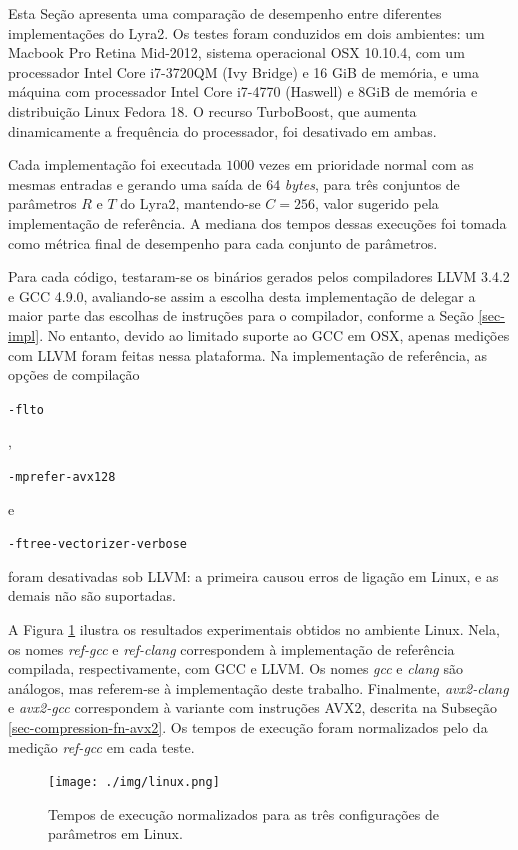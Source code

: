 \documentclass{article}
\begin{document}
Esta Seção apresenta uma comparação de desempenho entre diferentes
implementações do Lyra2. Os testes foram conduzidos em dois ambientes: um
Macbook Pro Retina Mid-2012, sistema operacional OSX 10.10.4, com um
processador Intel Core i7-3720QM (Ivy Bridge) e 16 GiB de memória, e uma
máquina com processador Intel Core i7-4770 (Haswell) e 8GiB de memória e
distribuição Linux Fedora 18. O recurso TurboBoost, que aumenta dinamicamente a
frequência do processador, foi desativado em ambas.

Cada implementação foi executada $1000$ vezes em prioridade normal com as
mesmas entradas e gerando uma saída de $64$ \emph{bytes}, para três conjuntos de parâmetros $R$ e
$T$ do Lyra2, mantendo-se $C = 256$, valor sugerido pela implementação de
referência. A mediana dos tempos dessas execuções foi tomada como métrica final
de desempenho para cada conjunto de parâmetros.

Para cada código, testaram-se os binários gerados pelos compiladores LLVM 3.4.2
e GCC 4.9.0, avaliando-se assim a escolha desta implementação de delegar a maior parte
das escolhas de instruções para o compilador, conforme a Seção \ref{sec-impl}.
No entanto, devido ao limitado suporte ao GCC em OSX, apenas medições com LLVM
foram feitas nessa plataforma. Na implementação de referência, as opções de
compilação \begin{small}\verb|-flto|\end{small},
\begin{small}\verb|-mprefer-avx128|\end{small} e
\begin{small}\verb|-ftree-vectorizer-verbose|\end{small} foram desativadas sob
LLVM: a primeira causou erros de ligação em Linux, e as demais não são
suportadas.

A Figura \ref{results-linux} ilustra os resultados experimentais obtidos no
ambiente Linux. Nela, os nomes \emph{ref-gcc} e \emph{ref-clang} correspondem à
implementação de referência compilada, respectivamente, com GCC e LLVM. Os
nomes \emph{gcc} e \emph{clang} são análogos, mas referem-se à implementação
deste trabalho. Finalmente, \emph{avx2-clang} e \emph{avx2-gcc} correspondem à
variante com instruções AVX2, descrita na Subseção
\ref{sec-compression-fn-avx2}. Os tempos de execução foram normalizados pelo da
medição \emph{ref-gcc} em cada teste.

\begin{figure}[htbp]
\centering
\texttt{[image: ./img/linux.png]}
\caption{Tempos de execução normalizados para as três configurações de parâmetros em Linux\label{results-linux}.}
\end{figure}
\end{document}
